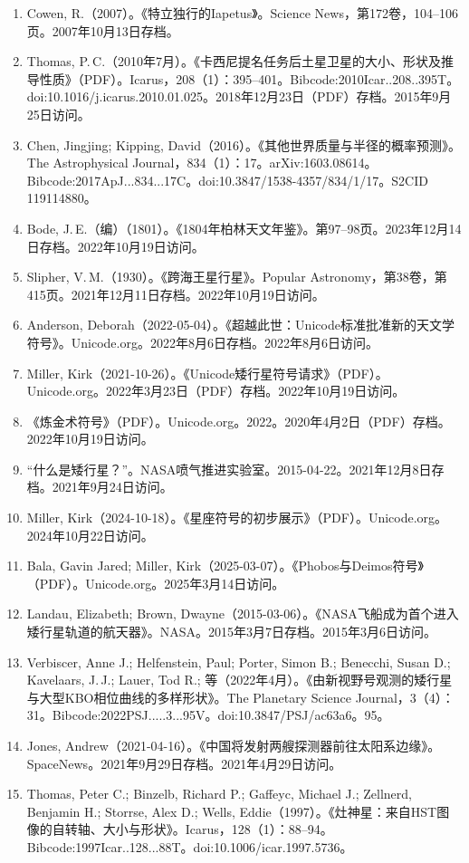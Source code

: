 \begin{enumerate}
\item Cowen, R.（2007）。《特立独行的Iapetus》。Science News，第172卷，104–106页。2007年10月13日存档。
\item Thomas, P.\,C.（2010年7月）。《卡西尼提名任务后土星卫星的大小、形状及推导性质》（PDF）。Icarus，208（1）：395–401。Bibcode:2010Icar..208..395T。doi:10.1016/j.icarus.2010.01.025。2018年12月23日（PDF）存档。2015年9月25日访问。
\item Chen, Jingjing; Kipping, David（2016）。《其他世界质量与半径的概率预测》。The Astrophysical Journal，834（1）：17。arXiv:1603.08614。Bibcode:2017ApJ...834...17C。doi:10.3847/1538-4357/834/1/17。S2CID 119114880。
\item Bode, J.\,E.（编）（1801）。《1804年柏林天文年鉴》。第97–98页。2023年12月14日存档。2022年10月19日访问。
\item Slipher, V.\,M.（1930）。《跨海王星行星》。Popular Astronomy，第38卷，第415页。2021年12月11日存档。2022年10月19日访问。
\item Anderson, Deborah（2022-05-04）。《超越此世：Unicode标准批准新的天文学符号》。Unicode.org。2022年8月6日存档。2022年8月6日访问。
\item Miller, Kirk（2021-10-26）。《Unicode矮行星符号请求》（PDF）。Unicode.org。2022年3月23日（PDF）存档。2022年10月19日访问。
\item 《炼金术符号》（PDF）。Unicode.org。2022。2020年4月2日（PDF）存档。2022年10月19日访问。
\item “什么是矮行星？”。NASA喷气推进实验室。2015-04-22。2021年12月8日存档。2021年9月24日访问。
\item Miller, Kirk（2024-10-18）。《星座符号的初步展示》（PDF）。Unicode.org。2024年10月22日访问。
\item Bala, Gavin Jared; Miller, Kirk（2025-03-07）。《Phobos与Deimos符号》（PDF）。Unicode.org。2025年3月14日访问。
\item Landau, Elizabeth; Brown, Dwayne（2015-03-06）。《NASA飞船成为首个进入矮行星轨道的航天器》。NASA。2015年3月7日存档。2015年3月6日访问。
\item Verbiscer, Anne J.; Helfenstein, Paul; Porter, Simon B.; Benecchi, Susan D.; Kavelaars, J.\,J.; Lauer, Tod R.; 等（2022年4月）。《由新视野号观测的矮行星与大型KBO相位曲线的多样形状》。The Planetary Science Journal，3（4）：31。Bibcode:2022PSJ.....3...95V。doi:10.3847/PSJ/ac63a6。95。
\item Jones, Andrew（2021-04-16）。《中国将发射两艘探测器前往太阳系边缘》。SpaceNews。2021年9月29日存档。2021年4月29日访问。
\item Thomas, Peter C.; Binzelb, Richard P.; Gaffeyc, Michael J.; Zellnerd, Benjamin H.; Storrse, Alex D.; Wells, Eddie（1997）。《灶神星：来自HST图像的自转轴、大小与形状》。Icarus，128（1）：88–94。Bibcode:1997Icar..128...88T。doi:10.1006/icar.1997.5736。

\end{enumerate}
